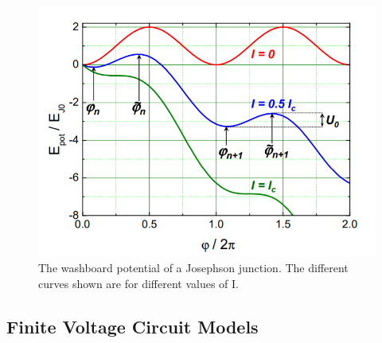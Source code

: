 \documentclass[conf]{new-aiaa}
\begin{document}
\begin{figure}[!ht]
    \centering
    \includegraphics[scale = 0.7]{washboard.PNG}
    \caption{The washboard potential of a Josephson junction. The different curves shown are for different values of I.}
    \label{fig:my_label}
\end{figure}

\subsection{Finite Voltage Circuit Models}
\end{document}
